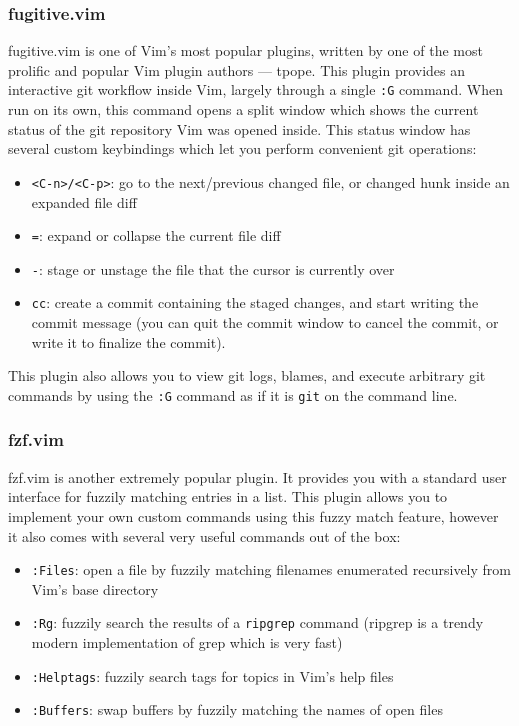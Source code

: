 \documentclass{beamer}
\begin{document}
\begin{frame}[fragile]
    \frametitle{fugitive.vim}
    \small
    fugitive.vim is one of Vim's most popular plugins, written by one of the most prolific and popular Vim plugin authors --- tpope. This plugin provides an interactive git workflow inside Vim, largely through a single \verb+:G+ command. When run on its own, this command opens a split window which shows the current status of the git repository Vim was opened inside. This status window has several custom keybindings which let you perform convenient git operations:
    \begin{itemize}
	\item \verb+<C-n>/<C-p>+: go to the next/previous changed file, or changed hunk inside an expanded file diff
	\item \verb+=+: expand or collapse the current file diff
	\item \verb+-+: stage or unstage the file that the cursor is currently over
	\item \verb+cc+: create a commit containing the staged changes, and start writing the commit message (you can quit the commit window to cancel the commit, or write it to finalize the commit).
    \end{itemize}
    This plugin also allows you to view git logs, blames, and execute arbitrary git commands by using the \verb+:G+ command as if it is \verb+git+ on the command line.
\end{frame}

\begin{frame}[fragile]
    \frametitle{fzf.vim}
    \small
    fzf.vim is another extremely popular plugin. It provides you with a standard user interface for fuzzily matching entries in a list. This plugin allows you to implement your own custom commands using this fuzzy match feature, however it also comes with several very useful commands out of the box:\\
    \begin{itemize}
	\item \verb+:Files+: open a file by fuzzily matching filenames enumerated recursively from Vim's base directory
	\item \verb+:Rg+: fuzzily search the results of a \verb+ripgrep+ command (ripgrep is a trendy modern implementation of grep which is very fast)
	\item \verb+:Helptags+: fuzzily search tags for topics in Vim's help files
	\item \verb+:Buffers+: swap buffers by fuzzily matching the names of open files
    \end{itemize}
\end{frame}
\end{document}
